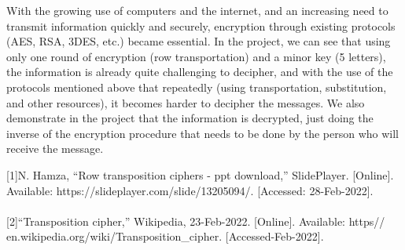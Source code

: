 \documentclass[twoside,twocolumn]{article}
\begin{document}
With the growing use of computers and the internet, and an increasing need to transmit information quickly and securely, encryption through existing protocols (AES, RSA, 3DES, etc.) became essential. 
In the project, we can see that using only one round of encryption (row transportation) and a minor key (5 letters), the information is already quite challenging to decipher, and with the use of the protocols mentioned above that repeatedly (using transportation, substitution, and other resources), it becomes harder to decipher the messages. 
We also demonstrate in the project that the information is decrypted, just doing the inverse of the encryption procedure that needs to be done by the person who will receive the message.
 \\ 

\vspace*{5.5cm}
\begin{thebibliography}{} %

\footnotesize[1]N. Hamza, “Row transposition ciphers - ppt download,” SlidePlayer. [Online]. Available: https://slideplayer.com/slide/13205094/. [Accessed: 28-Feb-2022].  \\ \\

\footnotesize[2]“Transposition cipher,” Wikipedia, 23-Feb-2022. [Online]. Available: https\:// en.wikipedia.org/wiki/Transposition\_cipher. [Accessed-Feb-2022]. \\ \\


 
\end{thebibliography}


\end{document}
